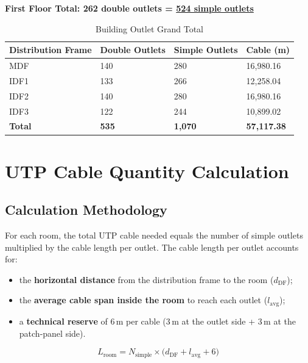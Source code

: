 \documentclass[12pt,a4paper]{report}
\begin{document}
\noindent\textbf{First Floor Total: 262 double outlets = \underline{524 simple outlets}}

\bigskip
\begin{table}[H]
  \centering
  \caption{Building Outlet Grand Total}
  \label{tab:outlets_total}
  \begin{tabular}{L{3cm} R{2.5cm} R{2.5cm} R{2.5cm}}
    \toprule
    \textbf{Distribution Frame} & \textbf{Double Outlets} & \textbf{Simple Outlets} & \textbf{Cable (m)} \\
    \midrule
    MDF  & 140 & 280 & 16{,}980.16 \\
    IDF1 & 133 & 266 & 12{,}258.04 \\
    IDF2 & 140 & 280 & 16{,}980.16 \\
    IDF3 & 122 & 244 & 10{,}899.02 \\
    \midrule
    \textbf{Total} & \textbf{535} & \textbf{1{,}070} & \textbf{57{,}117.38} \\
    \bottomrule
  \end{tabular}
\end{table}

\section{UTP Cable Quantity Calculation}

\subsection{Calculation Methodology}

For each room, the total UTP cable needed equals the number of simple outlets
multiplied by the cable length per outlet.
The cable length per outlet accounts for:
\begin{itemize}[noitemsep]
  \item the \textbf{horizontal distance} from the distribution frame to the room ($d_{\text{DF}}$);
  \item the \textbf{average cable span inside the room} to reach each outlet ($l_{\text{avg}}$);
  \item a \textbf{technical reserve} of 6\,m per cable (3\,m at the outlet side + 3\,m at the patch-panel side).
\end{itemize}

\begin{equation}
  L_{\text{room}} = N_{\text{simple}} \times \bigl(d_{\text{DF}} + l_{\text{avg}} + 6\bigr)
  \label{eq:utp_cable}
\end{equation}
\end{document}

